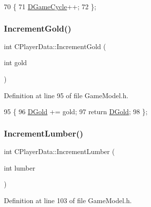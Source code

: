 \begin{DoxyCode}
70                              \{
71             \hyperlink{classCPlayerData_ae92ca06a63a01681dd9f3ddc17c0e106}{DGameCycle}++;
72         \};
\end{DoxyCode}
\hypertarget{classCPlayerData_a4d99d876561ac76a9d4f7a3e2f7f3edb}{}\label{classCPlayerData_a4d99d876561ac76a9d4f7a3e2f7f3edb} 
\subsubsection{\texorpdfstring{Increment\+Gold()}{IncrementGold()}}
{\footnotesize\ttfamily int C\+Player\+Data\+::\+Increment\+Gold (\begin{DoxyParamCaption}\item[{int}]{gold }\end{DoxyParamCaption})\hspace{0.3cm}{\ttfamily [inline]}}



Definition at line 95 of file Game\+Model.\+h.


\begin{DoxyCode}
95                                    \{
96             \hyperlink{classCPlayerData_afa66ff31262c9b287ae8c13259aae6f3}{DGold} += gold;
97             \textcolor{keywordflow}{return} \hyperlink{classCPlayerData_afa66ff31262c9b287ae8c13259aae6f3}{DGold};   
98         \};
\end{DoxyCode}
\hypertarget{classCPlayerData_a4115ca5ce5e6f10e64c0a310d5348c93}{}\label{classCPlayerData_a4115ca5ce5e6f10e64c0a310d5348c93} 
\subsubsection{\texorpdfstring{Increment\+Lumber()}{IncrementLumber()}}
{\footnotesize\ttfamily int C\+Player\+Data\+::\+Increment\+Lumber (\begin{DoxyParamCaption}\item[{int}]{lumber }\end{DoxyParamCaption})\hspace{0.3cm}{\ttfamily [inline]}}



Definition at line 103 of file Game\+Model.\+h.



